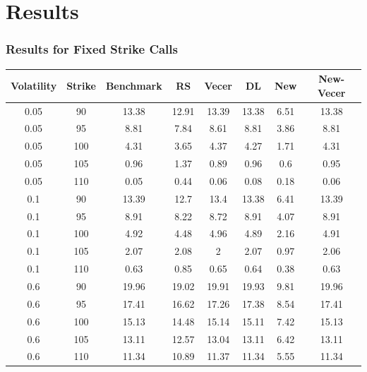 \documentclass{beamer}
\begin{document}
  \section{Results}

  \begin{frame}
    \frametitle{Results for Fixed Strike Calls}
    \small
    \begin{table}[h]
      \begin{tabular}{|c|c|c|c|c|c|c|c|}
      \hline
      Volatility & Strike & Benchmark & RS & Vecer & DL & New & New-Vecer \\
      \hline
      0.05 & 90 & 13.38 & 12.91 & 13.39 & 13.38 & 6.51 & 13.38 \\
      0.05 & 95 & 8.81 & 7.84 & 8.61 & 8.81 & 3.86 & 8.81 \\
      0.05 & 100 & 4.31 & 3.65 & 4.37 & 4.27 & 1.71 & 4.31 \\
      0.05 & 105 & 0.96 & 1.37 & 0.89 & 0.96 & 0.6 & 0.95 \\
      0.05 & 110 & 0.05 & 0.44 & 0.06 & 0.08 & 0.18 & 0.06 \\
      0.1 & 90 & 13.39 & 12.7 & 13.4 & 13.38 & 6.41 & 13.39 \\
      0.1 & 95 & 8.91 & 8.22 & 8.72 & 8.91 & 4.07 & 8.91 \\
      0.1 & 100 & 4.92 & 4.48 & 4.96 & 4.89 & 2.16 & 4.91 \\
      0.1 & 105 & 2.07 & 2.08 & 2 & 2.07 & 0.97 & 2.06 \\
      0.1 & 110 & 0.63 & 0.85 & 0.65 & 0.64 & 0.38 & 0.63 \\
      0.6 & 90 & 19.96 & 19.02 & 19.91 & 19.93 & 9.81 & 19.96 \\
      0.6 & 95 & 17.41 & 16.62 & 17.26 & 17.38 & 8.54 & 17.41 \\
      0.6 & 100 & 15.13 & 14.48 & 15.14 & 15.11 & 7.42 & 15.13 \\
      0.6 & 105 & 13.11 & 12.57 & 13.04 & 13.11 & 6.42 & 13.11 \\
      0.6 & 110 & 11.34 & 10.89 & 11.37 & 11.34 & 5.55 & 11.34 \\
      \hline
      \end{tabular}
    \end{table}
  \end{frame}
\end{document}
